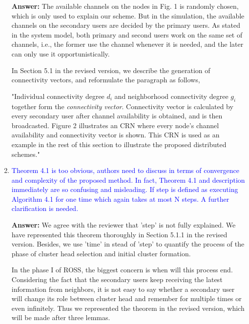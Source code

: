 \documentclass[10pt,a4paper]{article}
\begin{document}
\begin{enumerate}
\textbf{Answer:} 
The available channels on the nodes in Fig. 1 is randomly chosen, which is only used to explain our scheme.
But in the simulation, the available channels on the secondary users are decided by the primary users.
As stated in the system model, both primary and second users work on the same set of channels, i.e., the former use the channel whenever it is needed, and the later can only use it opportunistically.
 
  In Section 5.1 in the revised version, we describe the generation of connectivity vectors, and reformulate the paragraph as follows, 
  
  "Individual connectivity degree $d_i$ and neighborhood connectivity degree $g_i$ together form the \textit{connectivity vector}.
Connectivity vector is calculated by every secondary user after channel availability is obtained, and is then broadcasted.
Figure 2 illustrates an CRN where every node's channel availability and connectivity vector is shown.
This CRN is used as an example in the rest of this section to illustrate the proposed distributed schemes."

\item \textcolor{blue}{  Theorem 4.1 is too obvious, authors need to discuss in terms of convergence and complexity of the proposed method. In fact, Theorem 4.1 and description immediately are so confusing and misleading. If step is defined as executing Algorithm 4.1 for one time which again takes at most N steps. A further clarification is needed.}

\textbf{Answer:} We agree with the reviewer that 'step' is not fully explained.
	We have represented this theorem thoroughly in Section 5.1.1 in the revised version.
	Besides, we use 'time' in stead of 'step' to quantify the process of the phase of cluster head selection and initial cluster formation.
	
	In the phase I of ROSS, the biggest concern is when will this process end.
	Considering the fact that the secondary users keep receiving the latest information from neighbors, it is not easy to say whether a secondary user will change its role between cluster head and remember for multiple times or even infinitely.
	Thus we represented the theorem in the revised version, which will be made after three lemmas.
	

\end{enumerate}
\end{document}
